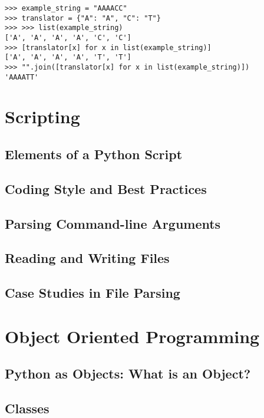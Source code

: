 \documentclass[a4paper,11pt]{article}
\begin{document}
\vspace{3mm}
\begin{lstlisting}
>>> example_string = "AAAACC"
>>> translator = {"A": "A", "C": "T"}
>>> >>> list(example_string)
['A', 'A', 'A', 'A', 'C', 'C']
>>> [translator[x] for x in list(example_string)]
['A', 'A', 'A', 'A', 'T', 'T']
>>> "".join([translator[x] for x in list(example_string)])
'AAAATT'
\end{lstlisting}
\vspace{3mm}


\pagebreak
\section{Scripting}
\subsection{Elements of a Python Script}

\pagebreak
\subsection{Coding Style and Best Practices}

\pagebreak
\subsection{Parsing Command-line Arguments}

\pagebreak
\subsection{Reading and Writing Files}

\pagebreak
\subsection{Case Studies in File Parsing}

\pagebreak
\section{Object Oriented Programming}
\subsection{Python as Objects: What is an Object?}

\pagebreak
\subsection{Classes}
\end{document}
